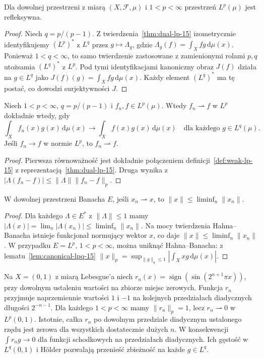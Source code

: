 \begin{twierdzenie}[Refleksywność $L^p$]
\label{thm:reflexive-lp-15}
Dla dowolnej przestrzeni z miarą $(X,\mathcal F,\mu)$
i $1<p<\infty$ przestrzeń $L^p(\mu)$ jest refleksywna.
\end{twierdzenie}
\begin{proof}
Niech $q=p/(p-1)$. Z twierdzenia~\ref{thm:dual-lp-15}
izometrycznie identyfikujemy $(L^p)^*$ z $L^q$ przez
$g\mapsto\Lambda_g$, gdzie $\Lambda_g(f)=\int_Xfg\,\mathrm d\mu(x)$.
Ponieważ $1<q<\infty$, to samo twierdzenie zastosowane
z zamienionymi rolami $p,q$ utożsamia $(L^q)^*$ z $L^p$.
Pod tymi identyfikacjami kanoniczny obraz $J(f)$
działa na $g\in L^q$ jako $J(f)(g)=\int_Xfg\,\mathrm d\mu(x)$.
Każdy element $(L^q)^*$ ma tę postać, co dowodzi
surjektywności $J$.
\end{proof}

\begin{twierdzenie}
\label{thm:weak-lp-15}
Niech $1<p<\infty$, $q=p/(p-1)$ i $f_n,f\in L^p(\mu)$.
Wtedy $f_n\rightharpoonup f$ w $L^p$ dokładnie wtedy, gdy
\[
\int_Xf_n(x)g(x)\,\mathrm d\mu(x)
\longrightarrow\int_Xf(x)g(x)\,\mathrm d\mu(x)
\quad\text{dla każdego }g\in L^q(\mu).
\]
Jeśli $f_n\to f$ w normie $L^p$, to $f_n\rightharpoonup f$.
\end{twierdzenie}
\begin{proof}
Pierwsza równoważność jest dokładnie połączeniem
definicji~\ref{def:weak-lp-15} z
reprezentacją~\ref{thm:dual-lp-15}.
Druga wynika z $|\Lambda(f_n-f)|\le\|\Lambda\|\|f_n-f\|_p$.
\end{proof}

\begin{twierdzenie}
\label{thm:weak-lsc-15}
W dowolnej przestrzeni Banacha $E$, jeśli $x_n\rightharpoonup x$,
to $\|x\|\le\liminf_n\|x_n\|$.
\end{twierdzenie}
\begin{proof}
Dla każdego $\Lambda\in E^*$ z $\|\Lambda\|\le1$
mamy $|\Lambda(x)|=\lim_n|\Lambda(x_n)|
\le\liminf_n\|x_n\|$.
Na mocy twierdzenia Hahna--Banacha istnieje
funkcjonał normujący wektor $x$, co daje
$\|x\|\le\liminf_n\|x_n\|$.
W przypadku $E=L^p$, $1<p<\infty$, można uniknąć
Hahna--Banacha: z lematu~\ref{lem:canonical-lpq-15}
$\|x\|_p=\sup_{\|g\|_q\le1}|\int_Xxg\,\mathrm d\mu(x)|$.
\end{proof}

\begin{przyklad}
Na $X=(0,1)$ z miarą Lebesgue'a niech
$r_n(x)=\operatorname{sign}(\sin(2^{n+1}\pi x))$,
przy dowolnym ustaleniu wartości na zbiorze miejsc zerowych.
Funkcja $r_n$ przyjmuje naprzemiennie wartości $1$ i $-1$
na kolejnych przedziałach diadycznych długości $2^{-n-1}$.
Dla każdego $1<p<\infty$ mamy $\|r_n\|_p=1$, lecz
$r_n\rightharpoonup0$ w $L^p(0,1)$. Istotnie, całka
$r_n$ po dowolnym przedziale diadycznym ustalonego
rzędu jest zerowa dla wszystkich dostatecznie dużych $n$.
W konsekwencji $\int r_ng\to0$ dla funkcji schodkowych
na przedziałach diadycznych. Ich gęstość w $L^q(0,1)$
i Hölder pozwalają przenieść zbieżność na każde $g\in L^q$.
\end{przyklad}

